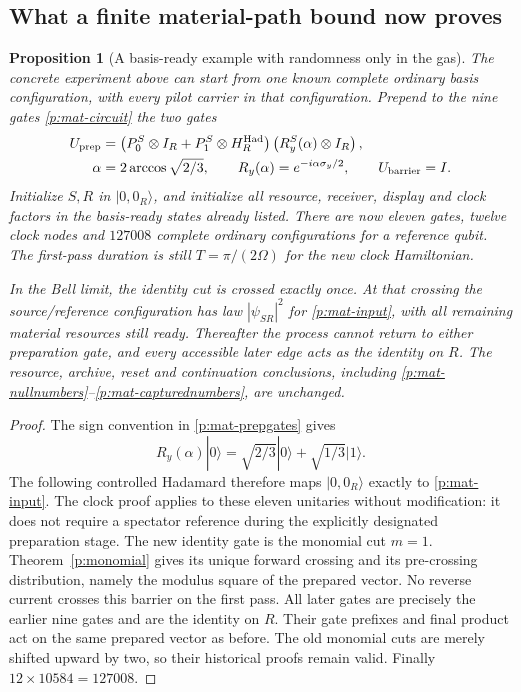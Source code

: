 \documentclass[11pt,oneside,openany]{book}
\newtheorem{proposition}[theorem]{Proposition}
\theoremstyle{definition}
\theoremstyle{remark}\newtheorem{remark}[theorem]{Remark}
\begin{document}
\subsection{What a finite material-path bound now proves}

\begin{proposition}[A basis-ready example with randomness only in the gas]
\label{p:prepared}
The concrete experiment above can start from one known complete ordinary
basis configuration, with every pilot carrier in that configuration.
Prepend to the nine gates \eqref{p:mat-circuit} the two gates
\begin{align}\label{p:mat-prepgates}
 U_{\rm prep}
 &=\left(P_0^S\otimes I_R+P_1^S\otimes H_R^{\rm Had}\right)
       \left(R_y^S(\alpha)\otimes I_R\right),\\
 \alpha&=2\arccos\sqrt{2/3},\qquad
 R_y(\alpha)=e^{-i\alpha\sigma_y/2},\qquad
 U_{\rm barrier}=I.\nonumber
\end{align}
Initialize $S,R$ in $|0,0_R\rangle$, and initialize all resource,
receiver, display and clock factors in the basis-ready states already
listed.  There are now eleven gates, twelve clock nodes and $127008$
complete ordinary configurations for a reference qubit.  The first-pass
duration is still $T=\pi/(2\Omega)$ for the new clock Hamiltonian.

In the Bell limit, the identity cut is crossed exactly once.  At that
crossing the source/reference configuration has law $|\psi_{SR}|^2$
for \eqref{p:mat-input}, with all remaining material resources still ready.
Thereafter the process cannot return to either preparation gate, and
every accessible later edge acts as the identity on $R$.  The resource,
archive, reset and continuation conclusions, including
\eqref{p:mat-nullnumbers}--\eqref{p:mat-capturednumbers}, are unchanged.
\end{proposition}
\begin{proof}
The sign convention in \eqref{p:mat-prepgates} gives
\[
 R_y(\alpha)|0\rangle=\sqrt{2/3}|0\rangle+
                                \sqrt{1/3}|1\rangle.
\]
The following controlled Hadamard therefore maps $|0,0_R\rangle$
exactly to \eqref{p:mat-input}.  The clock proof applies to these eleven
unitaries without modification: it does not require a spectator
reference during the explicitly designated preparation stage.
The new identity gate is the monomial cut $m=1$.
Theorem~\ref{p:monomial} gives its unique forward crossing and its
pre-crossing distribution, namely the modulus square of the prepared
vector.  No reverse current crosses this barrier on the first pass.
All later gates are precisely the earlier nine gates and are the
identity on $R$.  Their gate prefixes and final product act on the
same prepared vector as before.  The old monomial cuts are merely
shifted upward by two, so their historical proofs remain valid.
Finally $12\times10584=127008$.
\end{proof}
\end{document}
